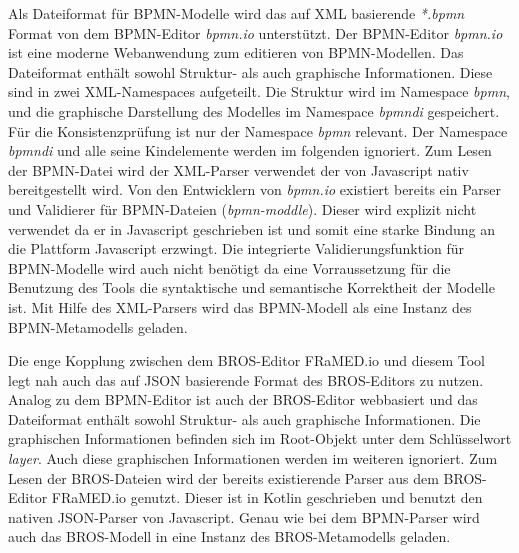 Als Dateiformat für BPMN-Modelle wird das auf XML basierende \emph{*.bpmn} Format von dem BPMN-Editor \emph{bpmn.io} unterstützt.
Der BPMN-Editor \emph{bpmn.io} ist eine moderne Webanwendung zum editieren von BPMN-Modellen.
Das Dateiformat enthält sowohl Struktur- als auch graphische Informationen.
Diese sind in zwei XML-Namespaces aufgeteilt.
Die Struktur wird im Namespace \emph{bpmn}, und die graphische Darstellung des Modelles im Namespace \emph{bpmndi} gespeichert.
Für die Konsistenzprüfung ist nur der Namespace \emph{bpmn} relevant.
Der Namespace \emph{bpmndi} und alle seine Kindelemente werden im folgenden ignoriert.
Zum Lesen der BPMN-Datei wird der XML-Parser verwendet der von Javascript nativ bereitgestellt wird.
Von den Entwicklern von \emph{bpmn.io} existiert bereits ein Parser und Validierer für BPMN-Dateien (\emph{bpmn-moddle}).
Dieser wird explizit nicht verwendet da er in Javascript geschrieben ist und somit eine starke Bindung an die Plattform Javascript erzwingt.
Die integrierte Validierungsfunktion für BPMN-Modelle wird auch nicht benötigt da eine Vorraussetzung für die Benutzung des Tools die syntaktische und semantische Korrektheit der Modelle ist. 
Mit Hilfe des XML-Parsers wird das BPMN-Modell als eine Instanz des BPMN-Metamodells geladen.

Die enge Kopplung zwischen dem BROS-Editor FRaMED.io und diesem Tool legt nah auch das auf JSON basierende Format des BROS-Editors zu nutzen.
Analog zu dem BPMN-Editor ist auch der BROS-Editor webbasiert und das Dateiformat enthält sowohl Struktur- als auch graphische Informationen.
Die graphischen Informationen befinden sich im Root-Objekt unter dem Schlüsselwort \emph{layer}.
Auch diese graphischen Informationen werden im weiteren ignoriert.
Zum Lesen der BROS-Dateien wird der bereits existierende Parser aus dem BROS-Editor FRaMED.io genutzt.
Dieser ist in Kotlin geschrieben und benutzt den nativen JSON-Parser von Javascript.
Genau wie bei dem BPMN-Parser wird auch das BROS-Modell in eine Instanz des BROS-Metamodells geladen.

